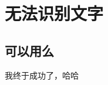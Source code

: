 \documentclass[master,openright,utf,arialtoc]{tongjithesis}
\begin{document}
\graphicspath{{figures/}}


\frontmatter

\makecover



\tableofcontents

%




\mainmatter

\chapter{无法识别文字}
\section{可以用么}
我终于成功了，哈哈

\backmatter

\makeatother

%
%

%

%

%
\end{document}
